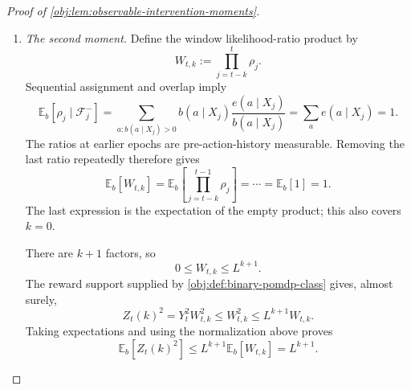 \documentclass[11pt]{article}
\begin{document}
\begin{proof}[Proof of \cref{obj:lem:observable-intervention-moments}]
\begin{enumerate}
In the zero-based convention, \cref{obj:ass:stationary-start} gives
\[
\mathbb E_b[f(S_0)]
=
\sum_{s\in\mathcal S}d_b(s)f(s),
\qquad d_bP_b=d_b.
\]
The unweighted one-step identity propagates this equality. Indeed, if it holds at epoch \(j\), then
\[
\begin{aligned}
\mathbb E_b[f(S_{j+1})]
&=\mathbb E_b[(P_bf)(S_j)]\\
&=\sum_s d_b(s)\sum_{s'}P_b(s,s')f(s')\\
&=\sum_{s'}(d_bP_b)(s')f(s')
=\sum_{s'}d_b(s')f(s').
\end{aligned}
\]
Thus, by induction,
\[
\mathbb E_b[f(S_j)]=\sum_s d_b(s)f(s),
\qquad 0\le j<T.
\]

Finally, the backward recursion agrees with matrix powers:
\[
f_{e,0}=P_e^0r_e,\qquad
f_{e,\ell+1}
=P_ef_{e,\ell}
=P_e(P_e^\ell r_e)
=P_e^{\ell+1}r_e.
\]
Consequently,
\[
\begin{aligned}
\mathbb E_b[Z_t(k)]
&=\sum_s d_b(s)(P_e^kr_e)(s)\\
&=\sum_{s'}\left(\sum_s d_b(s)P_e^k(s,s')\right)r_e(s')\\
&=\sum_{s'}(d_bP_e^k)(s')r_e(s')
=d_bP_e^kr_e.
\end{aligned}
\]
This expression is independent of \(t\), so it gives the stated common moment \(m_k\).

\item \emph{The second moment.}
Define the window likelihood-ratio product by
\[
W_{t,k}:=\prod_{j=t-k}^{t}\rho_j.
\]
Sequential assignment and overlap imply
\[
\mathbb E_b[\rho_j\mid\mathcal F_j^-]
=
\sum_{a:b(a\mid X_j)>0}
b(a\mid X_j)\frac{e(a\mid X_j)}{b(a\mid X_j)}
=
\sum_a e(a\mid X_j)
=1.
\]
The ratios at earlier epochs are pre-action-history measurable. Removing the last ratio repeatedly therefore gives
\[
\mathbb E_b[W_{t,k}]
=
\mathbb E_b\!\left[\prod_{j=t-k}^{t-1}\rho_j\right]
=\cdots=
\mathbb E_b[1]
=1.
\]
The last expression is the expectation of the empty product; this also covers \(k=0\).

There are \(k+1\) factors, so
\[
0\le W_{t,k}\le L^{k+1}.
\]
The reward support supplied by \cref{obj:def:binary-pomdp-class} gives, almost surely,
\[
Z_t(k)^2
=Y_t^2W_{t,k}^2
\le W_{t,k}^2
\le L^{k+1}W_{t,k}.
\]
Taking expectations and using the normalization above proves
\[
\mathbb E_b[Z_t(k)^2]
\le L^{k+1}\mathbb E_b[W_{t,k}]
=L^{k+1}.
\]


\end{enumerate}
\end{proof}
\end{document}
